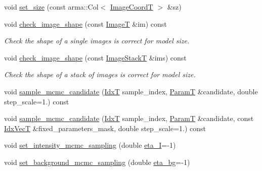 \begin{DoxyCompactItemize}
\item 
void \hyperlink{classmappel_1_1ImageFormat1DBase_ae35eebe826c2ffdb6e0b599806c88667}{set\+\_\+size} (const arma\+::\+Col$<$ \hyperlink{classmappel_1_1ImageFormat1DBase_a82ab3168eb1a87eaeb3e7c919188e9fc}{Image\+CoordT} $>$ \&sz)
\item 
void \hyperlink{classmappel_1_1ImageFormat1DBase_af308ca86f413f65e72ea7b8c890bd87a}{check\+\_\+image\+\_\+shape} (const \hyperlink{classmappel_1_1ImageFormat1DBase_a521a1ff391a52a636fac4aac7c7ba02c}{ImageT} \&im) const 
\begin{DoxyCompactList}\small\item\em Check the shape of a single images is correct for model size. \end{DoxyCompactList}\item 
void \hyperlink{classmappel_1_1ImageFormat1DBase_a8d5c0744643bf0bbbf30dd3122f98190}{check\+\_\+image\+\_\+shape} (const \hyperlink{classmappel_1_1ImageFormat1DBase_a81e3246d1c5c37ebf9077b7b5bd25a76}{Image\+StackT} \&ims) const 
\begin{DoxyCompactList}\small\item\em Check the shape of a stack of images is correct for model size. \end{DoxyCompactList}\item 
void \hyperlink{classmappel_1_1MCMCAdaptor1D_af99aecf740294e4945315a835ef5247a}{sample\+\_\+mcmc\+\_\+candidate} (\hyperlink{namespacemappel_ab17ec0f30b61ece292439d7ece81d3a8}{IdxT} sample\+\_\+index, \hyperlink{classmappel_1_1PointEmitterModel_a665ec6aea3aac139bb69a23c06d4b9a1}{ParamT} \&candidate, double step\+\_\+scale=1.) const 
\item 
void \hyperlink{classmappel_1_1MCMCAdaptor1D_af3e25b902a397fb5cbd2cbe32103d46f}{sample\+\_\+mcmc\+\_\+candidate} (\hyperlink{namespacemappel_ab17ec0f30b61ece292439d7ece81d3a8}{IdxT} sample\+\_\+index, \hyperlink{classmappel_1_1PointEmitterModel_a665ec6aea3aac139bb69a23c06d4b9a1}{ParamT} \&candidate, const \hyperlink{namespacemappel_ac63743dcd42180127307cd0e4ecdd784}{Idx\+VecT} \&fixed\+\_\+parameters\+\_\+mask, double step\+\_\+scale=1.) const 
\item 
void \hyperlink{classmappel_1_1MCMCAdaptor1D_ac70f768928859b1e9449b0ec1a141c4c}{set\+\_\+intensity\+\_\+mcmc\+\_\+sampling} (double \hyperlink{classmappel_1_1MCMCAdaptor1D_a5780d326be0c40e10d6c91777cfffbd3}{eta\+\_\+I}=-\/1)
\item 
void \hyperlink{classmappel_1_1MCMCAdaptor1D_ae79ee3845fbdd0e378f00eeebf8ccef1}{set\+\_\+background\+\_\+mcmc\+\_\+sampling} (double \hyperlink{classmappel_1_1MCMCAdaptor1D_af54c93421b8e298289cbb92743c6b3d5}{eta\+\_\+bg}=-\/1)

\end{DoxyCompactItemize}
